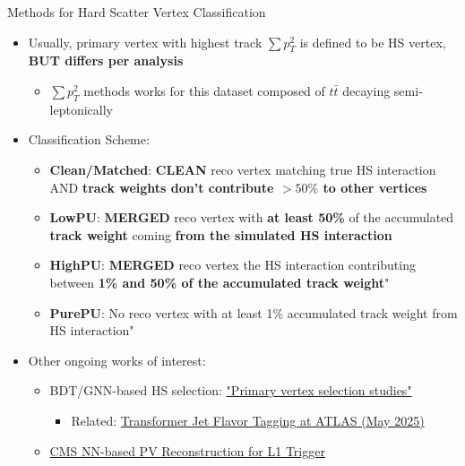 \documentclass[xcolor=table,aspectratio=169]{beamer}
\begin{document}
\begin{frame}{Methods for Hard Scatter Vertex Classification}
    \begin{itemize}
        \item Usually, primary vertex with highest track \( \sum p_T^2 \) is defined to be HS vertex, \textbf{BUT differs per analysis}
        \begin{itemize}
            \item \( \sum p_T^2 \) methods works for this dataset composed of \(t \bar{t}\) decaying semi-leptonically
        \end{itemize}
        \item Classification Scheme:
        \begin{itemize}
            \item \textbf{Clean/Matched}: \textbf{CLEAN} reco vertex matching true HS interaction AND \textbf{track weights don't contribute \(> 50 \%\) to other vertices}
            \item \textbf{LowPU}: \textbf{MERGED} reco vertex with \textbf{at least 50\%} of the accumulated \textbf{track weight} coming \textbf{from the simulated HS interaction}
            \item \textbf{HighPU}: \textbf{MERGED} reco vertex the HS interaction contributing between \textbf{1\% and 50\% of the accumulated track weight}"
            \item \textbf{PurePU}: No reco vertex with at least 1\% accumulated track weight from HS interaction"
        \end{itemize}
        \item Other ongoing works of interest:
        \begin{itemize}
            \item BDT/GNN-based HS selection: \href{https://indico.cern.ch/event/1374927/contributions/5942568/attachments/2882952/5052279/20240624_hsgnn.pdf}{"Primary vertex selection studies"}
            \begin{itemize}
                \item Related: \href{https://arxiv.org/pdf/2505.19689}{Transformer Jet Flavor Tagging at ATLAS (May 2025)}
            \end{itemize}
            \item \href{https://cds.cern.ch/record/2801638/files/CR2022_018.pdf?version=1}{CMS NN-based PV Reconstruction for L1 Trigger}
        \end{itemize}
    \end{itemize}
\end{frame}
\end{document}
